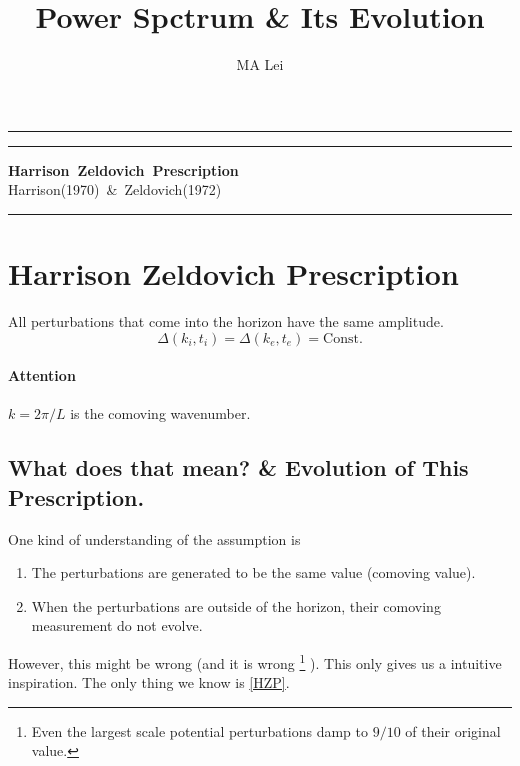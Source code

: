 \documentclass{article}
\begin{document}
\title{Power Spctrum \& Its Evolution}
\author{MA Lei}
\maketitle





\hrule\vspace{1pt}\hrule
\begin{center}
\mbox{{\bf Harrison Zeldovich Prescription}} \\
\vspace{0.5em}
\mbox{{Harrison(1970) \& Zeldovich(1972)}}
\end{center}
\hrule



\section{Harrison Zeldovich Prescription}
All perturbations that come into the horizon have the same amplitude.
\begin{equation}
\Delta(k_i,t_i)=\Delta(k_e,t_e)=\text{Const.} \label{HZP}
\end{equation}

\paragraph{Attention} $k=2\pi/L$ is the comoving wavenumber.







\subsection{What does that mean? \& Evolution of This Prescription.}

One kind of understanding of the assumption is
\begin{enumerate}
\item
The perturbations are generated to be the same value (comoving value).

\item
When the perturbations are outside of the horizon, their comoving measurement do not evolve.

\end{enumerate}

However, this might be wrong (and it is wrong
\footnote{Even the largest scale potential perturbations damp to $9/10$ of their original value.}
). This only gives us a intuitive inspiration. The only thing we know is \ref{HZP}.
\end{document}
